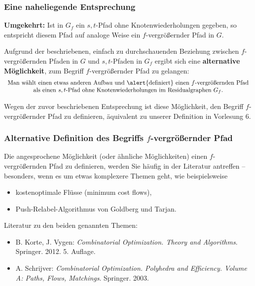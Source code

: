 \documentclass[smaller]{beamer}
\begin{document}
\begin{frame}
 \frametitle{Eine naheliegende Entsprechung}
 \textbf{Umgekehrt:} Ist in $G_f$ ein $s,t$-Pfad ohne Knotenwiederholungen gegeben, so entspricht diesem Pfad auf analoge Weise ein $f$-vergrößernder Pfad in $G$. \\ \vspace*{0.2cm}

Aufgrund der beschriebenen, einfach zu durchschauenden Beziehung zwischen $f$-vergrößernden Pfaden in $G$ und $s,t$-Pfaden in $G_f$ ergibt sich eine \textbf{alternative Möglichkeit}, zum Begriff \alert{$f$-vergrößernder Pfad} zu gelangen:
\begin{equation*}
\begin{array}{c}
\text{Man wählt einen etwas anderen Aufbau und \alert{definiert} einen $f$-vergrößernden Pfad} \\ \text{als einen $s,t$-Pfad ohne Knotenwiederholungen im Residualgraphen $G_f$.}
\end{array}
\end{equation*} \vspace*{0.2cm}

Wegen der zuvor beschriebenen Entsprechung ist diese Möglichkeit, den Begriff {\glqq}$f$-vergrößernder Pfad{\grqq} zu definieren, \alert{äquivalent} zu unserer Definition in Vorlesung 6.
\end{frame}

\begin{frame}
 \frametitle{Alternative Definition des Begriffs {\glqq}$f$-vergrößernder Pfad{\grqq}}
 Die angesprochene Möglichkeit (oder ähnliche Möglichkeiten) einen $f$-vergrößernden Pfad zu definieren, werden Sie häufig in der Literatur antreffen -- besonders, wenn es um etwas komplexere Themen geht, wie beispielsweise
\begin{itemize}
	\item kostenoptimale Flüsse (minimum cost flows),
	\item Push-Relabel-Algorithmus von Goldberg und Tarjan.
\end{itemize} \vspace*{0.2cm}

Literatur zu den beiden genannten Themen:
\begin{itemize}
\item B. Korte, J. Vygen: \textit{Combinatorial Optimization. Theory and Algorithms}. Springer. 2012. 5. Auflage.
\item A. Schrijver: \textit{Combinatorial Optimization. Polyhedra and Efficiency. Volume A: Paths, Flows, Matchings}. Springer. 2003.
\end{itemize}

\end{frame}
\end{document}
